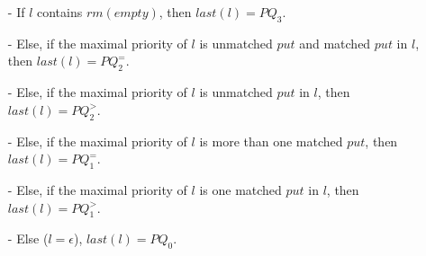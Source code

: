 \begin{itemize}
\setlength{\itemsep}{0.5pt}
\item[-] If $l$ contains $\textit{rm}(\textit{empty})$, then $\textit{last}(l) = \textit{PQ}_3$.

\item[-] Else, if the maximal priority of $l$ is unmatched $\textit{put}$ and matched $\textit{put}$ in $l$, then $\textit{last}(l) = \textit{PQ}_2^{=}$.

\item[-] Else, if the maximal priority of $l$ is unmatched $\textit{put}$ in $l$, then $\textit{last}(l) = \textit{PQ}_2^{>}$.

\item[-] Else, if the maximal priority of $l$ is more than one matched $\textit{put}$, then $\textit{last}(l) = \textit{PQ}_1^{=}$.

\item[-] Else, if the maximal priority of $l$ is one matched $\textit{put}$ in $l$, then $\textit{last}(l) = \textit{PQ}_1^{>}$.

\item[-] Else ($l = \epsilon$), $\textit{last}(l) = \textit{PQ}_0$.
\end{itemize}
